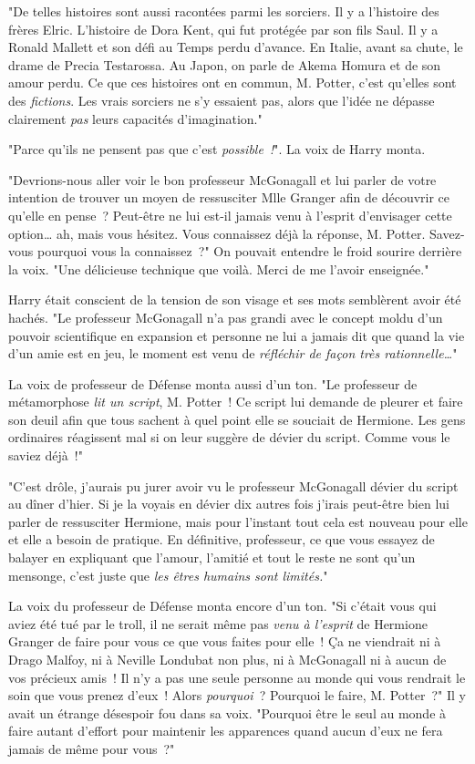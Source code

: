 "De telles histoires sont aussi racontées parmi les sorciers. Il y a l'histoire des frères Elric. L'histoire de Dora Kent, qui fut protégée par son fils Saul. Il y a Ronald Mallett et son défi au Temps perdu d'avance. En Italie, avant sa chute, le drame de Precia Testarossa. Au Japon, on parle de Akema Homura et de son amour perdu. Ce que ces histoires ont en commun, M. Potter, c'est qu'elles sont des \emph{fictions}. Les vrais sorciers ne s'y essaient pas, alors que l'idée ne dépasse clairement \emph{pas} leurs capacités d'imagination."

"Parce qu'ils ne pensent pas que c'est \emph{possible~!}". La voix de Harry monta.

"Devrions-nous aller voir le bon professeur McGonagall et lui parler de votre intention de trouver un moyen de ressusciter Mlle Granger afin de découvrir ce qu'elle en pense~? Peut-être ne lui est-il jamais venu à l'esprit d'envisager cette option… ah, mais vous hésitez. Vous connaissez déjà la réponse, M. Potter. Savez-vous pourquoi vous la connaissez~?" On pouvait entendre le froid sourire derrière la voix. "Une délicieuse technique que voilà. Merci de me l'avoir enseignée."

Harry était conscient de la tension de son visage et ses mots semblèrent avoir été hachés. "Le professeur McGonagall n'a pas grandi avec le concept moldu d'un pouvoir scientifique en expansion et personne ne lui a jamais dit que quand la vie d'un amie est en jeu, le moment est venu de \emph{réfléchir de façon très rationnelle…}"

La voix de professeur de Défense monta aussi d'un ton. "Le professeur de métamorphose \emph{lit un script}, M. Potter~! Ce script lui demande de pleurer et faire son deuil afin que tous sachent à quel point elle se souciait de Hermione. Les gens ordinaires réagissent mal si on leur suggère de dévier du script. Comme vous le saviez déjà~!"

"C'est drôle, j'aurais pu jurer avoir vu le professeur McGonagall dévier du script au dîner d'hier. Si je la voyais en dévier dix autres fois j'irais peut-être bien lui parler de ressusciter Hermione, mais pour l'instant tout cela est nouveau pour elle et elle a besoin de pratique. En définitive, professeur, ce que vous essayez de balayer en expliquant que l'amour, l'amitié et tout le reste ne sont qu'un mensonge, c'est juste que \emph{les êtres humains sont limités.}"

La voix du professeur de Défense monta encore d'un ton. "Si c'était vous qui aviez été tué par le troll, il ne serait même pas \emph{venu à l'esprit} de Hermione Granger de faire pour vous ce que vous faites pour elle~! Ça ne viendrait ni à Drago Malfoy, ni à Neville Londubat non plus, ni à McGonagall ni à aucun de vos précieux amis~! Il n'y a pas une seule personne au monde qui vous rendrait le soin que vous prenez d'eux~! Alors \emph{pourquoi}~? Pourquoi le faire, M. Potter~?" Il y avait un étrange désespoir fou dans sa voix. "Pourquoi être le seul au monde à faire autant d'effort pour maintenir les apparences quand aucun d'eux ne fera jamais de même pour vous~?"

